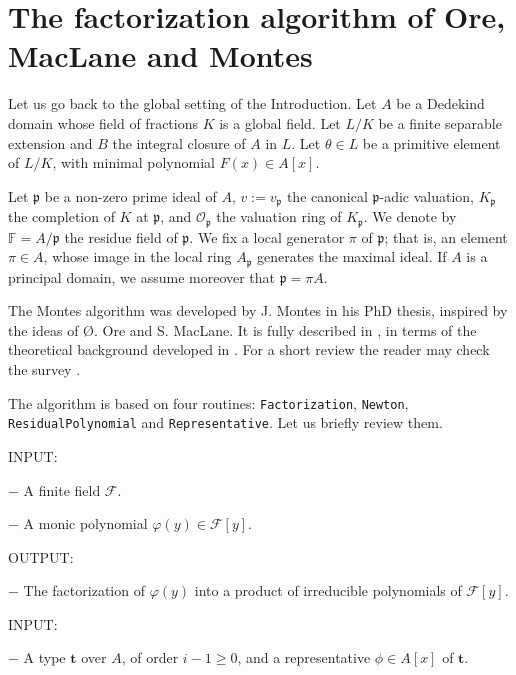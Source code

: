 \documentclass{amsart}
\begin{document}
\section{The factorization algorithm of Ore, MacLane and Montes}\label{secAlgo}
Let us go back to the global setting of the Introduction. Let $A$ be a Dedekind domain whose field of fractions $K$ is a global field. Let $L/K$ be a finite separable extension and $B$ the integral closure of $A$ in $L$. Let ${\theta}\in L$ be a primitive element of $L/K$, with minimal polynomial $F(x)\in A[x]$.

Let ${\mathfrak{p}}$ be a non-zero prime ideal of $A$, $v:=v_{\mathfrak{p}}$ the canonical ${\mathfrak{p}}$-adic valuation, $K_{\mathfrak{p}}$ the completion of $K$ at ${\mathfrak{p}}$, and ${\mathcal{O}}_{\mathfrak{p}}$ the valuation ring of $K_{\mathfrak{p}}$. We denote by ${\mathbb F}=A/{\mathfrak{p}}$ the residue field of ${\mathfrak{p}}$. We fix a local generator $\pi$ of ${\mathfrak{p}}$; that is, an element $\pi\in A$, whose image in the local ring $A_{\mathfrak{p}}$ generates the maximal ideal. If $A$ is a principal domain, we assume moreover that ${\mathfrak{p}}=\pi A$. 

The Montes algorithm was developed by J. Montes in his PhD thesis, inspired by the ideas of \O. Ore and S. MacLane. It is fully described in \cite{algorithm}, in terms of the theoretical background developed in \cite{HN}. For a short review the reader may check the survey \cite{Nsurvey}.

The algorithm is based on four routines: {\tt Factorization}, {\tt Newton}, {\tt ResidualPo\-lynomial} and {\tt Representative}. Let us briefly review them.\bigskip

\vskip 1mm

\noindent INPUT:

\noindent $-$ A finite field $\mathcal{F}$.

\noindent $-$ A monic polynomial $\varphi(y)\in \mathcal{F}[y]$.\medskip

\noindent OUTPUT:

\noindent $-$ The factorization of $\varphi(y)$ into a product of irreducible polynomials of $\mathcal{F}[y]$.\bigskip

\vskip 1mm

\noindent INPUT:

\noindent $-$ A type ${\mathbf{t}}$ over $A$, of order $i-1\ge 0$, and a representative $\phi\in A[x]$ of ${\mathbf{t}}$.
\end{document}
